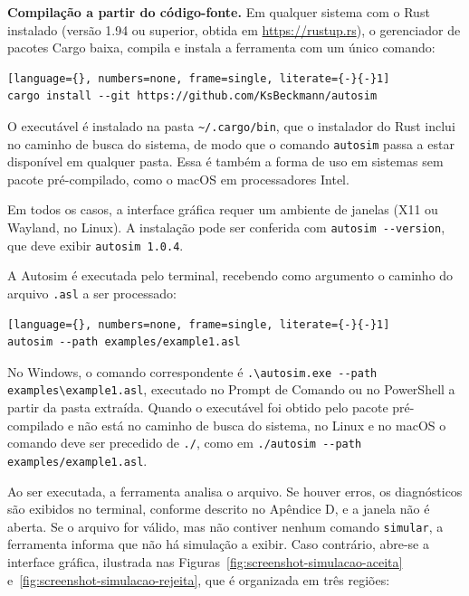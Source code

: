 \documentclass[
    12pt
    ,oneside
    ,a4paper
    ,chapter=TITLE
    ,section=TITLE
    ,sumario=abnt-6027-2012]{abntex2}
\begin{document}
\textbf{Compilação a partir do código-fonte.} Em qualquer sistema com o Rust instalado
(versão 1.94 ou superior, obtida em \url{https://rustup.rs}), o gerenciador de pacotes
Cargo baixa, compila e instala a ferramenta com um único comando:

\begin{lstlisting}[language={}, numbers=none, frame=single, literate={-}{-}1]
cargo install --git https://github.com/KsBeckmann/autosim
\end{lstlisting}

O executável é instalado na pasta \texttt{\textasciitilde/.cargo/bin}, que o instalador do
Rust inclui no caminho de busca do sistema, de modo que o comando \texttt{autosim} passa a
estar disponível em qualquer pasta. Essa é também a forma de uso em sistemas sem pacote
pré-compilado, como o macOS em processadores Intel.

Em todos os casos, a interface gráfica requer um ambiente de janelas (X11 ou Wayland, no
Linux). A instalação pode ser conferida com \texttt{autosim -{}-version}, que deve exibir
\texttt{autosim 1.0.4}.


A Autosim é executada pelo terminal, recebendo como argumento o caminho do arquivo
\texttt{.asl} a ser processado:

\begin{lstlisting}[language={}, numbers=none, frame=single, literate={-}{-}1]
autosim --path examples/example1.asl
\end{lstlisting}

No Windows, o comando correspondente é
\texttt{.\textbackslash autosim.exe -{}-path examples\textbackslash example1.asl},
executado no Prompt de Comando ou no PowerShell a partir da pasta extraída. Quando o executável foi obtido pelo
pacote pré-compilado e não está no caminho de busca do sistema, no Linux e no macOS o
comando deve ser precedido de \texttt{./}, como em \texttt{./autosim -{}-path
examples/example1.asl}.

Ao ser executada, a ferramenta analisa o arquivo. Se houver erros, os diagnósticos são
exibidos no terminal, conforme descrito no Apêndice D, e a janela não é aberta. Se o
arquivo for válido, mas não contiver nenhum comando \texttt{simular}, a ferramenta informa
que não há simulação a exibir. Caso contrário, abre-se a interface gráfica, ilustrada nas
Figuras~\ref{fig:screenshot-simulacao-aceita} e~\ref{fig:screenshot-simulacao-rejeita},
que é organizada em três regiões:
\end{document}
